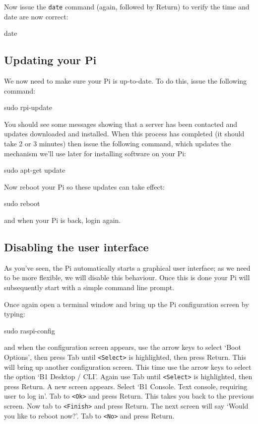 Now issue the \verb+date+ command (again, followed by Return) to
verify the time and date are now correct:
 
\begin{ttoutenv}
date
\end{ttoutenv}

\cbstart 
\subsection{Updating your Pi}
\label{sec:update2}
We now need to make sure your Pi is up-to-date. To do this, issue
the following command:

\begin{ttoutenv}
sudo rpi-update
\end{ttoutenv}

You should see some messages showing that a server has been contacted
and updates downloaded and installed. When this process has completed
(it should take 2 or 3 minutes) then issue the following command,
which updates the mechanism we'll use later for installing software
on your Pi:

\begin{ttoutenv}
sudo apt-get update
\end{ttoutenv}

Now reboot your Pi so these updates can take effect:

\begin{ttoutenv}
sudo reboot
\end{ttoutenv}

and when your Pi is back, login again.
\cbend

\subsection{Disabling the user interface}
\label{sec:update3}

As you've seen, the Pi automatically starts a graphical user
interface; as we need to be more flexible, we will disable this
behaviour. Once this is done your Pi will subsequently start with a
simple command line prompt.

Once again open a terminal window and bring up the Pi configuration
screen by typing:

\begin{ttoutenv}
sudo raspi-config
\end{ttoutenv}

and when the configuration screen appears, use the arrow keys to
select `Boot Options', then press Tab until \verb+<Select>+ is
highlighted, then press Return. This will bring up another
configuration screen. This time use the arrow keys to select the
option `B1 Desktop / CLI'. Again use Tab until \verb+<Select>+ is
highlighted, then press Return. A new screen appears. Select `B1
Console. Text console, requiring user to log in'. Tab to \verb+<Ok>+
and press Return. This takes you back to the previous screen. Now tab to
\verb+<Finish>+ and press Return. The next screen will say `Would you
like to reboot now?'. Tab to \verb+<No>+ and press Return.

